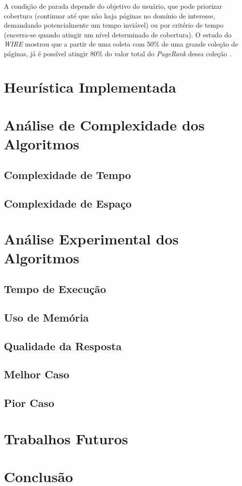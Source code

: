 \documentclass[a4paper,12pt,titlepage]{article}
\begin{document}
A condição de parada depende do objetivo do usuário, que pode priorizar cobertura (continuar até que não haja páginas no domínio de interesse, demandando potencialmente um tempo inviável) ou por critério de tempo (encerra-se quando atingir um nível determinado de cobertura). O estudo do \textit{WIRE} mostrou que a partir de uma coleta com 50\% de uma grande coleção de páginas, já é possível atingir 80\% do valor total do \textit{PageRank} dessa coleção \cite{carlos}.


\section{Heurística Implementada}

\section{Análise de Complexidade dos Algoritmos}
\subsection{Complexidade de Tempo}
\subsection{Complexidade de Espaço}

\section{Análise Experimental dos Algoritmos}
\subsection{Tempo de Execução}
\subsection{Uso de Memória}
\subsection{Qualidade da Resposta}
\subsection{Melhor Caso}
\subsection{Pior Caso}

\section{Trabalhos Futuros}
\section{Conclusão}


\newpage
\end{document}
